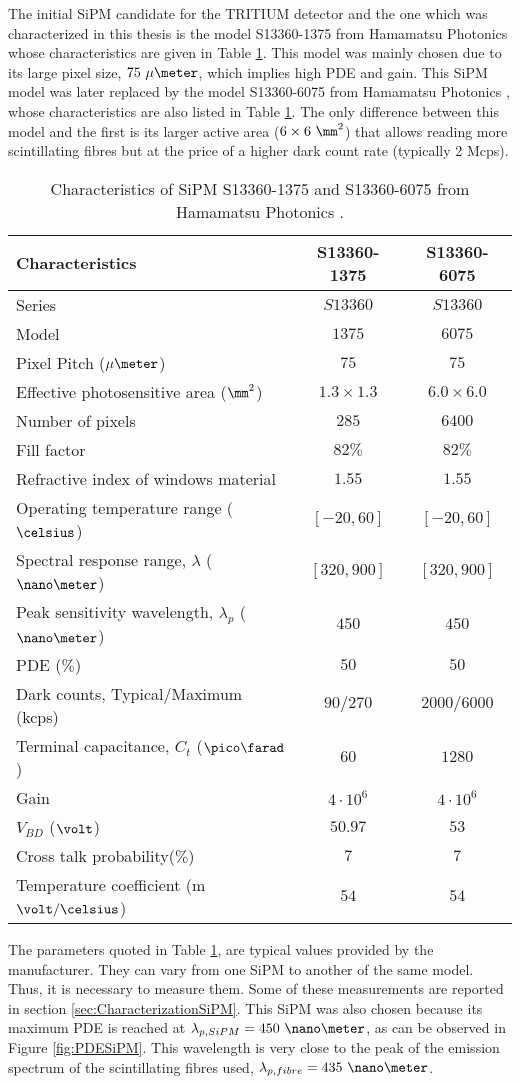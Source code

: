 The initial SiPM candidate for the TRITIUM detector and the one which was characterized in this thesis is the model S13360-1375 from Hamamatsu Photonics \cite{DataSheetHammamatsu_1_SiPM_1375} whose characteristics are given in Table \ref{tab:PropertiesOfSiPM1375}. This model was mainly chosen due to its large pixel size, $75~\mu\meter$, which implies high PDE and gain. This SiPM model was later replaced by the model S13360-6075 from Hamamatsu Photonics \cite{DataSheetHammamatsu_1_SiPM_75}, whose characteristics are also listed in Table \ref{tab:PropertiesOfSiPM1375}. The only difference between this model and the first is its larger active area ($6\times6~\mm^2$) that allows reading more scintillating fibres but at the price of a higher dark count rate (typically 2 Mcps).
\begin{table}[htbp]
\centering{}%
\begin{tabular}{lcc}
\toprule 
Characteristics & S13360-1375 & S13360-6075 \tabularnewline
\midrule
\midrule 
Series & $S13360$ & $S13360$ \tabularnewline
Model & $1375$ & $6075$ \tabularnewline
Pixel Pitch ($\mu\meter$) & $75$ & $75$ \tabularnewline
Effective photosensitive area ($\mm^2$) & $1.3 \times 1.3$ & $6.0 \times 6.0$ \tabularnewline
Number of pixels & $285$ & $6400$ \tabularnewline
Fill factor & $82\%$ & $82\%$ \tabularnewline
Refractive index of windows material & $1.55$ & $1.55$ \tabularnewline
Operating temperature range ($\celsius$) & $[-20,60]$ & $[-20,60]$ \tabularnewline
Spectral response range, $\lambda$ ($\nano\meter$) & $[320, 900]$ & $[320, 900]$ \tabularnewline
Peak sensitivity wavelength, $\lambda_p$ ($\nano\meter$) & $450$ & $450$ \tabularnewline
PDE ($\%$) & $50$ & $50$ \tabularnewline
Dark counts, Typical/Maximum (kcps) & $90/270$ & $2000/6000$ \tabularnewline
Terminal capacitance, $C_t$ ($\pico\farad$) & $60$ & $1280$ \tabularnewline
Gain & $4 \cdot{} 10^6$ & $4 \cdot{} 10^6$ \tabularnewline
$V_{BD}$ ($\volt$) & $50.97$ & $53$ \tabularnewline
Cross talk probability($\%$) & $7$ & $7$ \tabularnewline
Temperature coefficient (m$\volt/\celsius$) & $54$ & $54$ \tabularnewline
\bottomrule
\end{tabular}
\caption{Characteristics of SiPM S13360-1375 and S13360-6075 from Hamamatsu Photonics \cite{DataSheetHammamatsu_1_SiPM_1375}.}
\label{tab:PropertiesOfSiPM1375}
\end{table}
The parameters quoted in Table \ref{tab:PropertiesOfSiPM1375}, are typical values provided by the manufacturer. They can vary from one SiPM to another of the same model. Thus, it is necessary to measure them. Some of these measurements are reported in section \ref{sec:CharacterizationSiPM}.  This SiPM was also chosen because its maximum PDE is reached at $\lambda_{p,SiPM}=450~\nano\meter$, as can be observed in Figure \ref{fig:PDESiPM}. This wavelength is very close to the peak of the emission spectrum of the scintillating fibres used, $\lambda_{p,fibre}=435~\nano\meter$.
